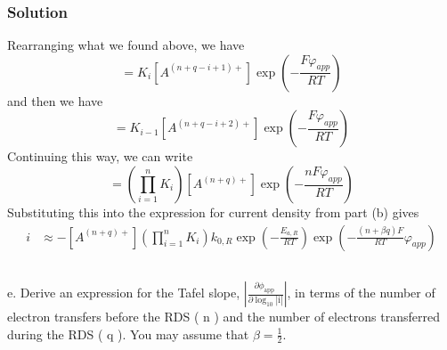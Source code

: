 \documentclass[12pt]{article}
\begin{document}
\subsubsection{Solution}
Rearranging what we found above, we have
\begin{equation}
[A^{(n+q-i)+}] = K_i [A^{(n+q-i+1)+}] \exp \left( -\frac{F \varphi_{app}}{RT} \right)
\end{equation}
and then we have
\begin{equation}
[A^{(n+q-i+1)+}] = K_{i-1} [A^{(n+q-i+2)+}] \exp \left( -\frac{F \varphi_{app}}{RT} \right)
\end{equation}
Continuing this way, we can write
\begin{equation}
[A^{q+}] = \left( \prod_{i=1}^{n} K_i \right) [A^{(n+q)+}] \exp \left( -\frac{n F \varphi_{app}}{RT} \right)
\end{equation}
Substituting this into the expression for current density from part (b) gives
\begin{align}
    i &\approx -[A^{(n+q)+}] \left( \prod_{i=1}^{n} K_i \right) k_{0,R} \exp \left( -\frac{E_{a,R}}{RT} \right) \exp \left( -\frac{(n+\beta q) F}{RT} \varphi_{app} \right) \label{final_current}
\end{align}
\subsection{}
e. Derive an expression for the Tafel slope, $\left|\frac{\partial \phi_{\text {app }}}{\partial \log _{10}|\mathrm{i}|}\right|$, in terms of the number of electron transfers before the RDS ( n ) and the number of electrons transferred during the RDS ( q ). You may assume that $\beta=\frac{1}{2}$.\\
\end{document}
